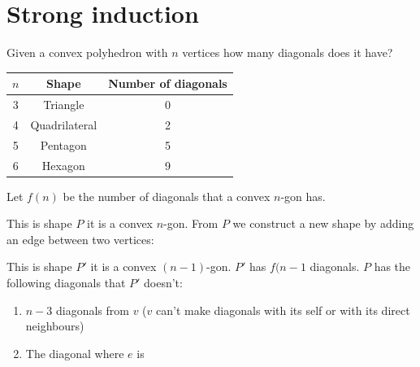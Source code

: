 \documentclass{article}
\begin{document}
\section{Strong induction}

Given a convex polyhedron with \(n\) vertices how many diagonals does it have?

\begin{center}
\begin{tabular}{|c|c|c|}\hline
\(n\) & Shape & Number of diagonals\\ \hline
3 & Triangle & 0\\
4 & Quadrilateral & 2\\
5 & Pentagon & 5\\
6 & Hexagon & 9\\ \hline
\end{tabular}
\end{center}

Let \(f(n)\) be the number of diagonals that a convex \(n\)-gon has.

\begin{center}
\end{center}

This is shape \(P\) it is a convex \(n\)-gon. From \(P\) we construct a new shape by adding an edge between two vertices:

\begin{center}
\end{center}

This is shape \(P'\) it is a convex \((n-1)\)-gon. \(P'\) has \(f(n-1\) diagonals. \(P\) has the following diagonals that \(P'\) doesn't:
\begin{enumerate}
\item \(n-3\) diagonals from \(v\) (\(v\) can't make diagonals with its self or with its direct neighbours)
\item The diagonal where \(e\) is
\end{enumerate}
\end{document}
